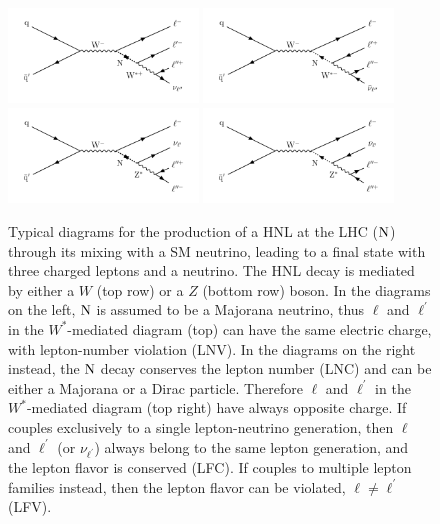 \begin{figure}
\centering
\includegraphics[width=0.45\textwidth]{Figures/c3/hnl_feyn.pdf}
\includegraphics[width=0.45\textwidth]{Figures/c3/hnl_feyn_2.pdf}\\
\includegraphics[width=0.45\textwidth]{Figures/c3/hnl_z_feyn.pdf}
\includegraphics[width=0.45\textwidth]{Figures/c3/hnl_z_feyn_2.pdf}
\caption{Typical diagrams for the production of a HNL at the LHC 
($\mathrm{N}$) through its mixing with a SM neutrino, leading to a
final state with three charged leptons and a neutrino.
The HNL decay is mediated by either a $W$ (top row) or a $Z$ (bottom
row) boson.
In the diagrams on the left, $\mathrm{N}$ is assumed to be a Majorana
neutrino, thus $\ell$ and $\ell^\prime$ in the $W^\ast$-mediated
diagram (top) can have the same electric charge, with lepton-number
violation (LNV).
In the diagrams on the right instead, the $\mathrm{N}$ decay conserves the
lepton number (LNC) and can be either a Majorana or a Dirac
particle. Therefore $\ell$ and $\ell^\prime$ in the
$W^\ast$-mediated diagram (top right) have always opposite charge.
If \hnl couples exclusively to a single lepton-neutrino generation,
then $\ell$ and $\ell^\prime$ (or $\nu_{\ell^{\prime}}$) always belong
to the same lepton generation, and the lepton flavor is conserved
(LFC). If \hnl couples to multiple lepton families instead, then the
lepton flavor can be violated, $\ell\neq\ell^\prime$ (LFV).}
\label{fig:c3hnldiagram}
\end{figure}


